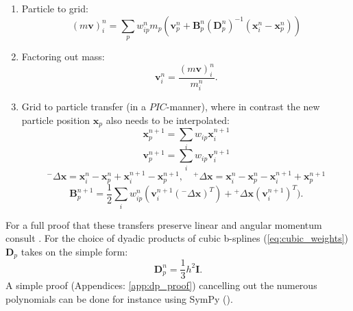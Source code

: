 \documentclass[m,times]{cgMA}
\begin{document}
\begin{enumerate}
  \item Particle to grid:
    \begin{equation}\label{eq:apic_mom_p2g}
    (m\boldsymbol{v})^n_i = \sum_p w^n_{ip}m_p (\boldsymbol { v } _ { p } ^ { n } + \boldsymbol { B } _ { p } ^ { n } ( \boldsymbol { D } _ { p } ^ { n } ) ^ { - 1 } ( \boldsymbol { x } _ { i } ^ { n } - \boldsymbol { x } _ { p } ^ { n } ) )
\end{equation}
  \item Factoring out mass:
    \begin{equation}\label{eq:mass_divide}
      \boldsymbol{v}_i^n = \frac{(m\boldsymbol{v})_i^n}{m_i^n}.
    \end{equation}
  \item Grid to particle transfer (in a $PIC$-manner), where in contrast the new particle position $\boldsymbol{x}_p$ also needs to be interpolated:
    \begin{equation}
      \boldsymbol{x}_{p}^{n+1} = \sum_i w_{ip}\boldsymbol{x}_i^{n+1}
    \end{equation}
    \begin{equation}
      \boldsymbol{v}_{p}^{n+1} = \sum_i w_{ip}\boldsymbol{v}_i^{n+1}
    \end{equation}
    $$
    {^-}\Delta \boldsymbol{x} = \boldsymbol { x } _ { i } ^ { n } - \boldsymbol { x } _ { p } ^ { n } +   \boldsymbol { x }_ { i } ^ { n + 1 } - \boldsymbol { x } _ { p } ^ { n + 1 },
    \quad {^+}\Delta \boldsymbol{x} = \boldsymbol { x } _ { i } ^ { n } - \boldsymbol { x } _ { p } ^ { n } -  { \boldsymbol { x } } _ { i } ^ { n + 1 } + \boldsymbol { x } _ { p } ^ { n + 1 }
    $$
\begin{equation}\label{eq:apic_mom_g2p}
  \boldsymbol { B } _ { p } ^ { n + 1 } = \frac { 1 } { 2 } \sum _ { i } w _ { i p } ^ { n } (\boldsymbol { v }_ { i } ^ { n + 1 } ({^-}\Delta \boldsymbol{x}) ^ { T }) {+}  {^+}\Delta \boldsymbol{x} ( { \boldsymbol { v } } _ { i } ^ { n + 1 } ) ^ { T }).
\end{equation}

\end{enumerate}
For a full proof that these transfers preserve linear and angular momentum consult \cite{MPM:APIC}. For the choice of dyadic products of cubic b-splines (\ref{eq:cubic_weights}) $\boldsymbol{D}_p$ takes on the simple form:
\begin{equation}
\boldsymbol{D}_p^n = \frac { 1 } { 3 } h ^ { 2 } \boldsymbol { I }.
\end{equation}
A simple proof (Appendices: \ref{app:dp_proof}) cancelling out the numerous polynomials can be done for instance using SymPy (\cite{Sympy}).\cite{MPM:APIC}\cite{MPM:OLD_APIC}
\end{document}
